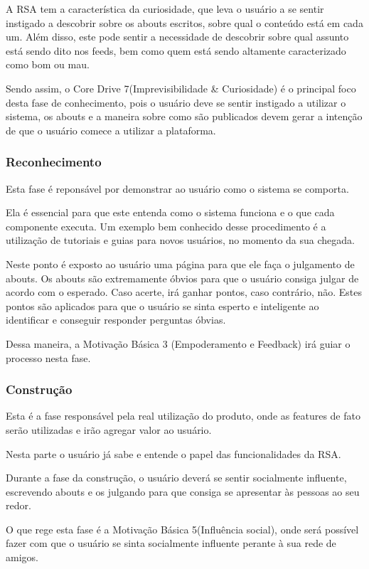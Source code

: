 A RSA tem a característica da curiosidade, que leva o usuário a se sentir instigado
a descobrir sobre os abouts escritos, sobre qual o conteúdo está  em cada
um. Além disso, este pode sentir a necessidade de descobrir sobre qual assunto está
sendo dito nos feeds, bem como quem está sendo altamente caracterizado como bom ou mau.

Sendo assim, o Core Drive 7(Imprevisibilidade \& Curiosidade) é o principal foco desta fase
de conhecimento, pois o usuário deve se sentir instigado a utilizar o sistema, os abouts
e a maneira sobre como são publicados  devem gerar a intenção de que o usuário comece a utilizar
a plataforma.


\subsubsection{Reconhecimento}
\label{sub:reconhecimento}
Esta fase é reponsável por demonstrar ao usuário como o sistema se comporta.

Ela é essencial para que este entenda como o sistema funciona e o que cada
componente executa. Um exemplo bem conhecido desse procedimento é a utilização
de tutoriais e guias para novos usuários, no momento da sua chegada.

Neste ponto é exposto ao usuário uma página para que ele faça o julgamento de 
abouts.
Os abouts são extremamente óbvios para que o usuário consiga julgar de acordo 
com o
esperado. Caso acerte, irá ganhar pontos, caso contrário, não. Estes pontos
são aplicados para que o usuário se sinta esperto e inteligente ao 
identificar e conseguir responder perguntas óbvias.

Dessa maneira, a Motivação Básica 3 (Empoderamento e Feedback) irá guiar o
processo nesta fase.

\subsubsection{Construção}
\label{sub:constru_o}
Esta é a fase responsável pela real utilização do produto, onde as features
de fato serão utilizadas e irão agregar valor ao usuário.

Nesta parte o usuário já sabe e entende o papel das funcionalidades da RSA.

Durante a fase da construção, o usuário deverá se sentir socialmente influente,
escrevendo abouts e os julgando para que consiga se apresentar às pessoas ao seu redor.

O que rege esta fase é a Motivação Básica 5(Influência social), onde será possível
fazer com que o usuário se sinta socialmente influente perante à sua rede de amigos.


